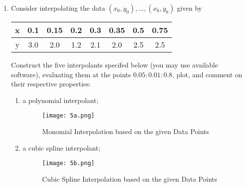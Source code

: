 \documentclass{article}
\begin{document}
\begin{enumerate}[label = {\arabic*}]
\begin{enumerate}
			\pagebreak
			
			
			
		\end{enumerate}
		\item Consider interpolating the data $(x_0, y_0), ..., (x_6, y_6)$ given by
		\begin{table}[h!]
			\centering
			\begin{tabular}{|c|c|c|c|c|c|c|c|}
				\hline
				x & 0.1 & 0.15 & 0.2 & 0.3 & 0.35 & 0.5 & 0.75 \\ \hline
				y & 3.0 & 2.0  & 1.2 & 2.1 & 2.0  & 2.5 & 2.5  \\ \hline
			\end{tabular}
		\end{table}
	
		 Construct the five interpolants specifed below (you may use available software), evaluating them at the points $0.05 : 0.01 : 0.8$, plot, and comment on their respective properties:
		\begin{enumerate}
			\item a polynomial interpolant;

			\begin{figure}[h!]
				\centering
				\caption{Monomial Interpolation based on the given Data Points}
				\texttt{[image: 5a.png]}
				\label{fig:monomial}
			\end{figure}
		
			\pagebreak

			
			
			\item a cubic spline interpolant;

			\begin{figure}[h!]
				\centering
				\caption{Cubic Spline Interpolation based on the given Data Points}
				\label{fig:cubicSpline}
				\texttt{[image: 5b.png]}
			\end{figure}
			
			
			

\end{enumerate}
\end{enumerate}
\end{document}
